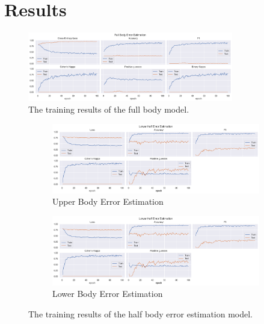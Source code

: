 \chapter{Results}

\begin{figure}
  \centering
  \includegraphics[width=0.8\textwidth]{figures/Results/fb/FullBodyErrorEstimation.png}
  \caption[Full Body model training results]{The training results of the full body model.}
  \label{fig:full_body_training_results}
\end{figure}


\begin{figure}
  \centering
  \begin{subfigure}[b]{0.8\textwidth}
      \centering
      \includegraphics[width=\textwidth]{figures/Results/hb/HalfBodyErrorEstimation_uh.png}
      \caption{Upper Body Error Estimation}
      \label{fig:uh_ee}
  \end{subfigure}
  \hfill
  \begin{subfigure}[b]{0.8\textwidth}
      \centering
      \includegraphics[width=\textwidth]{figures/Results/hb/HalfBodyErrorEstimation_lh.png}
      \caption{Lower Body Error Estimation}
      \label{fig:lh_ee}
  \end{subfigure}
  \caption[Half Body model training results]{The training results of the half body error estimation model.}
     \label{fig:half_body_training_results}
\end{figure}


